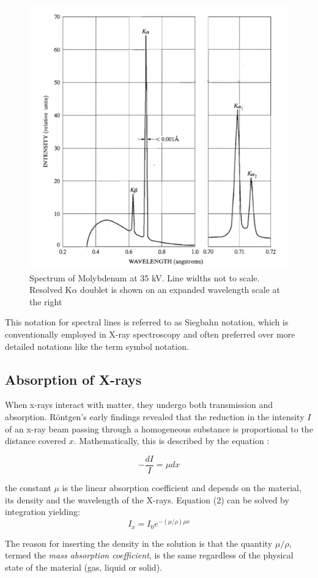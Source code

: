 \documentclass{article}
\begin{document}
\begin{figure}[h]
    \centering
    \includegraphics[width=0.5\linewidth]{Figures/image2.png}
    \caption{Spectrum of Molybdenum at 35 kV. Line widths not to scale. Resolved K$\alpha$ doublet is shown on an expanded wavelength scale at the right \cite{bernarddeniscullity_2015_elements}}
    \label{fig:mo35kv}
\end{figure}

This notation for spectral lines is referred to as Siegbahn notation, which is conventionally employed in X-ray spectroscopy and often preferred over more detailed notations like the term symbol notation.

\pagebreak{}

\subsection{Absorption of X-rays}
When x-rays interact with matter, they undergo both transmission and absorption. Röntgen's early findings revealed that the reduction in the intensity $I$ of an x-ray beam passing through a homogeneous substance is proportional to the distance covered $x$. Mathematically, this is described by the equation \cite{bernarddeniscullity_2015_elements}:

\begin{equation}
\label{eq:absorption}
    -\frac{dI}{I}= \mu dx
\end{equation}

the constant $\mu$ is the linear absorption coefficient and depends on the material, its density and the wavelength of the X-rays. Equation (2) can be solved by integration yielding: 
\begin{equation}
    I_x = I_0 e^{-(\mu/\rho)\rho x}
\end{equation}

The reason for inserting the density in the solution is that the quantity $\mu/\rho$, termed the \textit{mass absorption coefficient}, is the same regardless of the physical state of the material (gas, liquid or solid).
\end{document}
